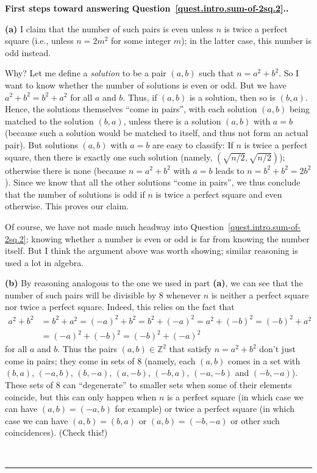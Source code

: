 \documentclass[numbers=enddot,12pt,final,onecolumn,notitlepage]{scrartcl}%
\numberwithin{exer}{section}
\theoremstyle{definition}
\newenvironment{proof}[1][Proof]{\noindent\textbf{#1.} }{\ \rule{0.5em}{0.5em}}
\newcommand{\ZZ}{\mathbb{Z}} %
\newcommand{\tup}[1]{\left( #1 \right)}
\begin{document}
\begin{proof}[First steps toward answering Question~\ref{quest.intro.sum-of-2sq.2}.]

\textbf{(a)} I claim that the number of such pairs is even
unless $n$ is twice a perfect square (i.e., unless $n = 2m^2$ for
some integer $m$); in the latter case, this number is odd
instead.

Why?
Let me define a \textit{solution} to be a pair $\tup{a, b}$
such that $n = a^2 + b^2$.
So I want to know whether the number of solutions is even or odd.
But we have $a^2 + b^2 = b^2 + a^2$ for all $a$ and $b$.
Thus, if $\tup{a, b}$ is a solution, then so is $\tup{b, a}$.
Hence, the solutions themselves ``come in pairs'',
with each solution $\tup{a, b}$ being matched to the solution $\tup{b, a}$,
unless there is a solution $\tup{a, b}$ with $a = b$ (because
such a solution would be matched to itself, and thus not form
an actual pair).
But solutions $\tup{a, b}$ with $a = b$ are easy to classify:
If $n$ is twice a perfect square, then there is exactly one
such solution (namely, $\tup{\sqrt{n/2}, \sqrt{n/2}}$);
otherwise there is none (because $n = a^2 + b^2$ with $a = b$
leads to $n = b^2 + b^2 = 2b^2$).
Since we know that all the other solutions ``come in pairs'',
we thus conclude that the number of solutions is odd if $n$
is twice a perfect square and even otherwise.
This proves our claim.

Of course, we have not made much headway into
Question~\ref{quest.intro.sum-of-2sq.2}; knowing whether a number
is even or odd is far from knowing the number itself.
But I think the argument above was worth showing; similar reasoning
is used a lot in algebra.

\textbf{(b)} By reasoning analogous to the one we used in
part \textbf{(a)}, we can see that the number of such pairs
will be divisible by $8$ whenever $n$ is neither a perfect
square nor twice a perfect square.
Indeed, this relies on the fact that
\begin{align*}
 a^2 + b^2 &= b^2 + a^2 = \tup{-a}^2 + b^2 = b^2 + \tup{-a}^2
 = a^2 + \tup{-b}^2 = \tup{-b}^2 + a^2 \\
 &= \tup{-a}^2 + \tup{-b}^2 = \tup{-b}^2 + \tup{-a}^2
\end{align*}
for all $a$ and $b$.
Thus the pairs $\tup{a, b} \in \ZZ^2$ that satisfy $n = a^2 + b^2$
don't just come in pairs; they come in sets of $8$
(namely, each $\tup{a, b}$ comes in a set with
$\tup{b, a}$, $\tup{-a, b}$, $\tup{b, -a}$, $\tup{a, -b}$,
$\tup{-b, a}$, $\tup{-a, -b}$ and $\tup{-b, -a}$).
These sets of $8$ can ``degenerate'' to smaller sets when
some of their elements coincide, but this can only happen
when $n$ is a perfect square (in which case we can have
$\tup{a, b} = \tup{-a, b}$ for example) or twice a perfect
square (in which case we can have
$\tup{a, b} = \tup{b, a}$ or $\tup{a, b} = \tup{-b, -a}$ or
other such coincidences). (Check this!)


\end{proof}
\end{document}
